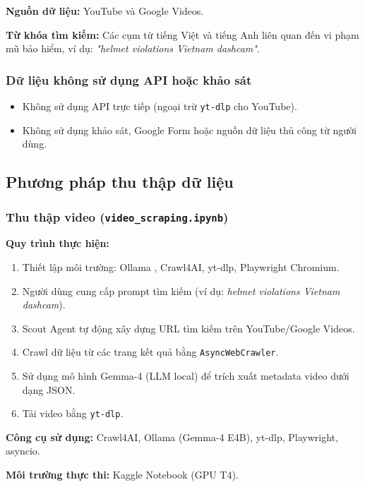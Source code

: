 \textbf{Nguồn dữ liệu:} YouTube và Google Videos.

\textbf{Từ khóa tìm kiếm:} Các cụm từ tiếng Việt và tiếng Anh liên quan đến vi phạm mũ bảo hiểm, ví dụ: \textit{"helmet violations Vietnam dashcam"}.

\subsubsection{Dữ liệu không sử dụng API hoặc khảo sát}

\begin{itemize}
    \item Không sử dụng API trực tiếp (ngoại trừ \texttt{yt-dlp} cho YouTube).
    \item Không sử dụng khảo sát, Google Form hoặc nguồn dữ liệu thủ công từ người dùng.
\end{itemize}

\subsection{Phương pháp thu thập dữ liệu}

\subsubsection{Thu thập video (\texttt{video\_scraping.ipynb})}

\textbf{Quy trình thực hiện:}

\begin{enumerate}
    \item Thiết lập môi trường: Ollama \cite{ollama2024}, Crawl4AI, yt-dlp, Playwright Chromium.
    \item Người dùng cung cấp prompt tìm kiếm (ví dụ: \textit{helmet violations Vietnam dashcam}).
    \item Scout Agent tự động xây dựng URL tìm kiếm trên YouTube/Google Videos.
    \item Crawl dữ liệu từ các trang kết quả bằng \texttt{AsyncWebCrawler}.
    \item Sử dụng mô hình Gemma-4 (LLM local) \cite{gemma2024} để trích xuất metadata video dưới dạng JSON.
    \item Tải video bằng \texttt{yt-dlp}.
\end{enumerate}

\textbf{Công cụ sử dụng:}
Crawl4AI, Ollama (Gemma-4 E4B), yt-dlp, Playwright, asyncio.

\textbf{Môi trường thực thi:}
Kaggle Notebook (GPU T4).

